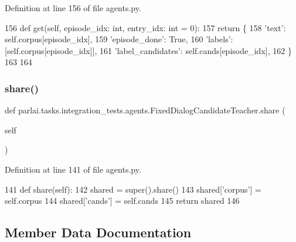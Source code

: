 Definition at line 156 of file agents.\+py.


\begin{DoxyCode}
156     \textcolor{keyword}{def }get(self, episode\_idx: int, entry\_idx: int = 0):
157         \textcolor{keywordflow}{return} \{
158             \textcolor{stringliteral}{'text'}: self.corpus[episode\_idx],
159             \textcolor{stringliteral}{'episode\_done'}: \textcolor{keyword}{True},
160             \textcolor{stringliteral}{'labels'}: [self.corpus[episode\_idx]],
161             \textcolor{stringliteral}{'label\_candidates'}: self.cands[episode\_idx],
162         \}
163 
164 
\end{DoxyCode}
\mbox{\label{classparlai_1_1tasks_1_1integration__tests_1_1agents_1_1FixedDialogCandidateTeacher_a50302ba3c9ee62f283d90e508a591971}} 
\subsubsection{\texorpdfstring{share()}{share()}}
{\footnotesize\ttfamily def parlai.\+tasks.\+integration\+\_\+tests.\+agents.\+Fixed\+Dialog\+Candidate\+Teacher.\+share (\begin{DoxyParamCaption}\item[{}]{self }\end{DoxyParamCaption})}



Definition at line 141 of file agents.\+py.


\begin{DoxyCode}
141     \textcolor{keyword}{def }share(self):
142         shared = super().share()
143         shared[\textcolor{stringliteral}{'corpus'}] = self.corpus
144         shared[\textcolor{stringliteral}{'cands'}] = self.cands
145         \textcolor{keywordflow}{return} shared
146 
\end{DoxyCode}


\subsection{Member Data Documentation}
\mbox{\label{classparlai_1_1tasks_1_1integration__tests_1_1agents_1_1FixedDialogCandidateTeacher_a46d2bbf92e60f81a46443e4faf252a18}} 

